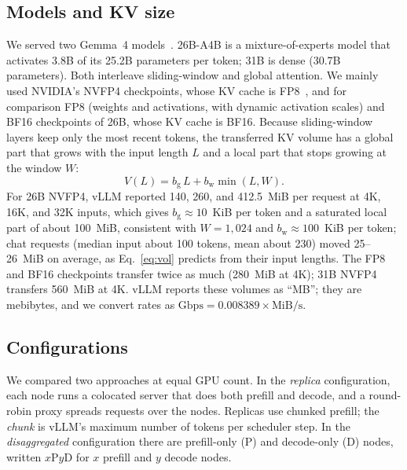 \documentclass[11pt]{article}
\begin{document}
\subsection{Models and KV size}\label{sec:kv}
We served two Gemma~4 models~\cite{gemma4}. 26B-A4B is a mixture-of-experts model that activates 3.8B of its 25.2B parameters per token; 31B is dense (30.7B parameters). Both interleave sliding-window and global attention. We mainly used NVIDIA's NVFP4 checkpoints, whose KV cache is FP8~\cite{nvfp4ckpt}, and for comparison FP8 (weights and activations, with dynamic activation scales) and BF16 checkpoints of 26B, whose KV cache is BF16. Because sliding-window layers keep only the most recent tokens, the transferred KV volume has a global part that grows with the input length $L$ and a local part that stops growing at the window $W$:
\begin{equation}\label{eq:vol}
V(L) = b_{\mathrm{g}}\,L + b_{\mathrm{w}} \min(L, W).
\end{equation}
For 26B NVFP4, vLLM reported 140, 260, and 412.5~MiB per request at 4K, 16K, and 32K inputs, which gives $b_{\mathrm{g}} \approx 10$~KiB per token and a saturated local part of about 100~MiB, consistent with $W = 1{,}024$ and $b_{\mathrm{w}} \approx 100$~KiB per token; chat requests (median input about 100 tokens, mean about 230) moved 25--26~MiB on average, as Eq.~\eqref{eq:vol} predicts from their input lengths. The FP8 and BF16 checkpoints transfer twice as much (280~MiB at 4K); 31B NVFP4 transfers 560~MiB at 4K. vLLM reports these volumes as ``MB''; they are mebibytes, and we convert rates as $\text{Gbps} = 0.008389 \times \text{MiB}/\text{s}$.

\subsection{Configurations}\label{sec:config}
We compared two approaches at equal GPU count. In the \emph{replica} configuration, each node runs a colocated server that does both prefill and decode, and a round-robin proxy spreads requests over the nodes. Replicas use chunked prefill; the \emph{chunk} is vLLM's maximum number of tokens per scheduler step. In the \emph{disaggregated} configuration there are prefill-only (P) and decode-only (D) nodes, written $x$P$y$D for $x$ prefill and $y$ decode nodes.
\end{document}
